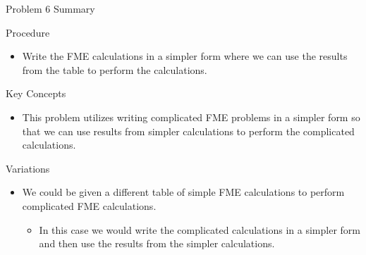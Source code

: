 \begin{summary}{Problem 6 Summary}
    \begin{statement}{Procedure}
        \begin{itemize}
            \item Write the FME calculations in a simpler form where we can use the results from the table to perform the calculations.
        \end{itemize}
    \end{statement}
    \begin{statement}{Key Concepts}
        \begin{itemize}
            \item This problem utilizes writing complicated FME problems in a simpler form so that we can use results from simpler calculations to perform the complicated calculations.
        \end{itemize}
    \end{statement}
    \begin{statement}{Variations}
        \begin{itemize}
            \item We could be given a different table of simple FME calculations to perform complicated FME calculations.
            \begin{itemize}
                \item In this case we would write the complicated calculations in a simpler form and then use the results from the simpler calculations.
            \end{itemize}
        \end{itemize}
    \end{statement}
\end{summary}

